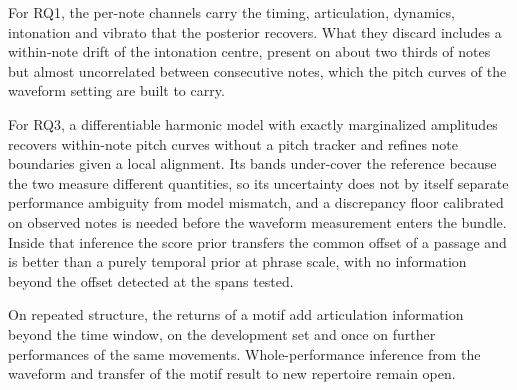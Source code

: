 \documentclass[11pt,a4paper]{report}
\begin{document}
For RQ1, the per-note channels carry the timing, articulation, dynamics,
intonation and vibrato that the posterior recovers. What they discard
includes a within-note drift of the intonation centre, present on about two
thirds of notes but almost uncorrelated between consecutive notes, which
the pitch curves of the waveform setting are built to carry.

For RQ3, a differentiable harmonic model with exactly marginalized
amplitudes recovers within-note pitch curves without a pitch tracker and
refines note boundaries given a local alignment. Its bands under-cover the
reference because the two measure different quantities, so its uncertainty
does not by itself separate performance ambiguity from model mismatch, and
a discrepancy floor calibrated on observed notes is needed before the
waveform measurement enters the bundle. Inside that inference the score
prior transfers the common offset of a passage and is better than a purely
temporal prior at phrase scale, with no information beyond the offset
detected at the spans tested.

On repeated structure, the returns of a motif add articulation information
beyond the time window, on the development set and once on further
performances of the same movements. Whole-performance inference from the
waveform and transfer of the motif result to new repertoire remain open.


\appendix
\end{document}
